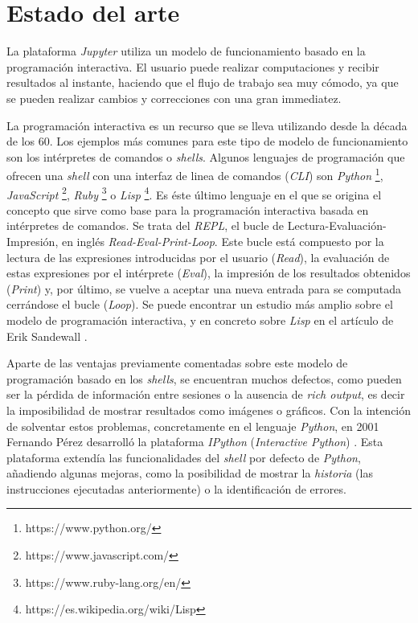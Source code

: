 \documentclass[11pt,spanish,listoffigures]{tfgetsinf}
\begin{document}


\chapter{Estado del arte}
\label{ch:state-of-art}

La plataforma \textit{Jupyter} utiliza un modelo de funcionamiento basado en la programación interactiva. El usuario puede realizar computaciones y recibir resultados al instante, haciendo que el flujo de trabajo sea muy cómodo, ya que se pueden realizar cambios y correcciones con una gran immediatez.

La programación interactiva es un recurso que se lleva utilizando desde la década de los 60. Los ejemplos más comunes para este tipo de modelo de funcionamiento son los intérpretes de comandos o \textit{shells}. Algunos lenguajes de programación que ofrecen una \textit{shell} con una interfaz de linea de comandos (\textit{CLI}) son \textit{Python} \footnote{https://www.python.org/}, \textit{JavaScript} \footnote{https://www.javascript.com/}, \textit{Ruby} \footnote{https://www.ruby-lang.org/en/} o \textit{Lisp} \footnote{https://es.wikipedia.org/wiki/Lisp}. Es éste último lenguaje en el que se origina el concepto que sirve como base para la programación interactiva basada en intérpretes de comandos. Se trata del \textit{REPL}, el bucle de Lectura-Evaluación-Impresión, en inglés \textit{Read-Eval-Print-Loop}. Este bucle está compuesto por la lectura de las expresiones introducidas por el usuario (\textit{Read}), la evaluación de estas expresiones por el intérprete (\textit{Eval}), la impresión de los resultados obtenidos (\textit{Print}) y, por último, se vuelve a aceptar una nueva entrada para se computada cerrándose el bucle (\textit{Loop}). Se puede encontrar un estudio más amplio sobre el modelo de programación interactiva, y en concreto sobre \textit{Lisp} en el artículo de Erik Sandewall \cite{Sandewall}.

Aparte de las ventajas previamente comentadas sobre este modelo de programación basado en los \textit{shells}, se encuentran muchos defectos, como pueden ser la pérdida de información entre sesiones o la ausencia de \textit{rich output}, es decir la imposibilidad de mostrar resultados como imágenes o gráficos. Con la intención de solventar estos problemas, concretamente en el lenguaje \textit{Python}, en 2001 Fernando Pérez desarrolló la plataforma \textit{IPython} (\textit{Interactive Python}) \cite{ipython}. Esta plataforma extendía las funcionalidades del \textit{shell} por defecto de \textit{Python}, añadiendo algunas mejoras, como la posibilidad de mostrar la \textit{historia} (las instrucciones ejecutadas anteriormente) o la identificación de errores.
\end{document}

